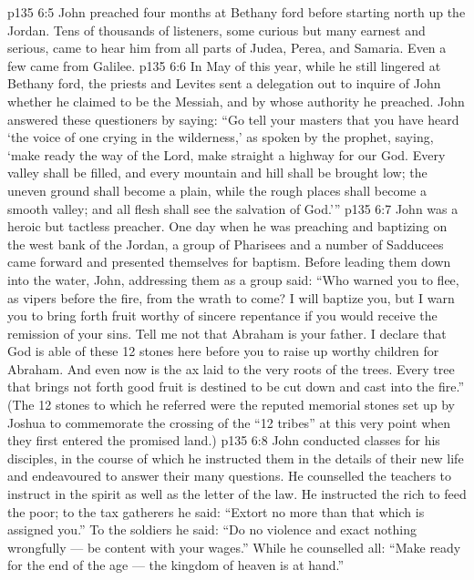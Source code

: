 \vs p135 6:5 John preached four months at Bethany ford before starting north up the Jordan. Tens of thousands of listeners, some curious but many earnest and serious, came to hear him from all parts of Judea, Perea, and Samaria. Even a few came from Galilee.
\vs p135 6:6 In May of this year, while he still lingered at Bethany ford, the priests and Levites sent a delegation out to inquire of John whether he claimed to be the Messiah, and by whose authority he preached. John answered these questioners by saying: “Go tell your masters that you have heard ‘the voice of one crying in the wilderness,’ as spoken by the prophet, saying, ‘make ready the way of the Lord, make straight a highway for our God. Every valley shall be filled, and every mountain and hill shall be brought low; the uneven ground shall become a plain, while the rough places shall become a smooth valley; and all flesh shall see the salvation of God.’”
\vs p135 6:7 John was a heroic but tactless preacher. One day when he was preaching and baptizing on the west bank of the Jordan, a group of Pharisees and a number of Sadducees came forward and presented themselves for baptism. Before leading them down into the water, John, addressing them as a group said: “Who warned you to flee, as vipers before the fire, from the wrath to come? I will baptize you, but I warn you to bring forth fruit worthy of sincere repentance if you would receive the remission of your sins. Tell me not that Abraham is your father. I declare that God is able of these 12 stones here before you to raise up worthy children for Abraham. And even now is the ax laid to the very roots of the trees. Every tree that brings not forth good fruit is destined to be cut down and cast into the fire.” (The 12 stones to which he referred were the reputed memorial stones set up by Joshua to commemorate the crossing of the “12 tribes” at this very point when they first entered the promised land.)
\vs p135 6:8 John conducted classes for his disciples, in the course of which he instructed them in the details of their new life and endeavoured to answer their many questions. He counselled the teachers to instruct in the spirit as well as the letter of the law. He instructed the rich to feed the poor; to the tax gatherers he said: “Extort no more than that which is assigned you.” To the soldiers he said: “Do no violence and exact nothing wrongfully --- be content with your wages.” While he counselled all: “Make ready for the end of the age --- the kingdom of heaven is at hand.”
